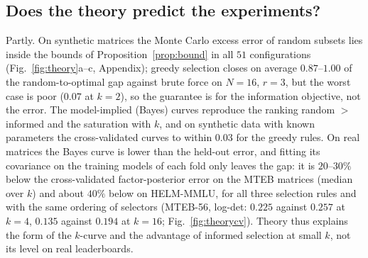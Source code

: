 \subsection{Does the theory predict the experiments?}
Partly. On synthetic matrices the Monte Carlo excess error of random subsets lies inside the bounds of Proposition~\ref{prop:bound} in all $51$ configurations (Fig.~\ref{fig:theory}a--c, Appendix); greedy selection closes on average $0.87$--$1.00$ of the random-to-optimal gap against brute force on $N=16$, $r=3$, but the worst case is poor ($0.07$ at $k=2$), so the guarantee is for the information objective, not the error. The model-implied (Bayes) curves reproduce the ranking random $>$ informed and the saturation with $k$, and on synthetic data with known parameters the cross-validated curves to within $0.03$ for the greedy rules. On real matrices the Bayes curve is lower than the held-out error, and fitting its covariance on the training models of each fold only leaves the gap: it is $20$--$30\%$ below the cross-validated factor-posterior error on the MTEB matrices (median over $k$) and about $40\%$ below on HELM-MMLU, for all three selection rules and with the same ordering of selectors (MTEB-56, log-det: $0.225$ against $0.257$ at $k=4$, $0.135$ against $0.194$ at $k=16$; Fig.~\ref{fig:theorycv}). Theory thus explains the form of the $k$-curve and the advantage of informed selection at small $k$, not its level on real leaderboards.
